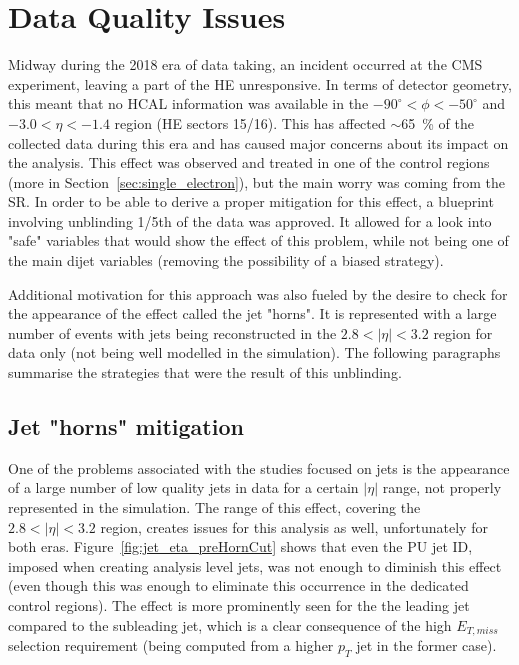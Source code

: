 \section{Data Quality Issues}
\label{sec:data_quality}
\hspace{10pt} Midway during the 2018 era of data taking, an incident occurred at the CMS experiment, leaving a part of the HE unresponsive. In terms of detector geometry, this meant that no HCAL information was available in the $-90^\circ<\phi<-50^\circ$ and $-3.0<\eta<-1.4$ region (HE sectors 15/16). This has affected $\sim$65~\% of the collected data during this era and has caused major concerns about its impact on the analysis. This effect was observed and treated in one of the control regions (more in Section~\ref{sec:single_electron}), but the main worry was coming from the SR. In order to be able to derive a proper mitigation for this effect, a blueprint involving unblinding 1/5th of the data was approved. It allowed for a look into "safe" variables that would show the effect of this problem, while not being one of the main dijet variables (removing the possibility of a biased strategy).

\hspace{10pt} Additional motivation for this approach was also fueled by the desire to check for the appearance of the effect called the jet "horns". It is represented with a large number of events with jets being reconstructed in the $2.8<|\eta|<3.2$ region for data only (not being well modelled in the simulation). The following paragraphs summarise the strategies that were the result of this unblinding.

\subsection{Jet "horns" mitigation}
\hspace{10pt} One of the problems associated with the studies focused on jets is the appearance of a large number of low quality jets in data for a certain $|\eta|$ range, not properly represented in the simulation. The range of this effect, covering the $2.8<|\eta|<3.2$ region, creates issues for this analysis as well, unfortunately for both eras. Figure~\ref{fig:jet_eta_preHornCut} shows that even the PU jet ID, imposed when creating analysis level jets, was not enough to diminish this effect (even though this was enough to eliminate this occurrence in the dedicated control regions). The effect is more prominently seen for the the leading jet compared to the subleading jet, which is a clear consequence of the high $E_{T,miss}$ selection requirement (being computed from a higher $p_T$ jet in the former case).


